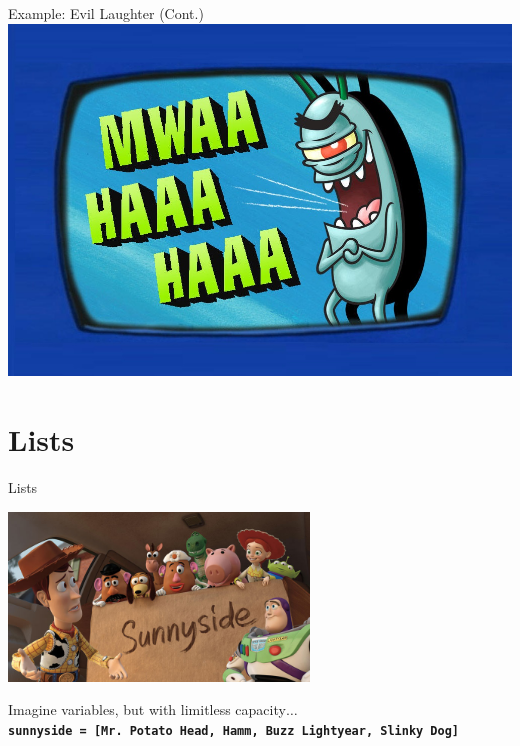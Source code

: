         \begin{frame}{Example: Evil Laughter (Cont.)}
            \centering
            \includegraphics[height=0.8\textheight]{images/evil_laugh.jpg}
        \end{frame}

    \section{Lists}
        \begin{frame}{Lists}
            \pause
            \begin{center}
                \includegraphics[width=0.6\textwidth]{../Lecture1/images/box_many.jpg}                
            \end{center}
            \pause
            \LARGE
            Imagine variables, but with limitless capacity$\dots$\\
            \pause
            \textbf{\texttt{sunnyside = [\textquotesingle Mr. Potato Head\textquotesingle, \textquotesingle Hamm\textquotesingle,
            \textquotesingle Buzz Lightyear\textquotesingle, \textquotesingle Slinky Dog\textquotesingle]}}
        \end{frame}

